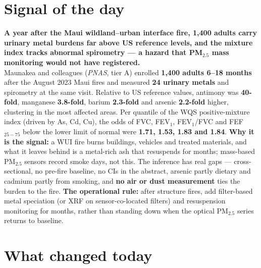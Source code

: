 \documentclass[10pt]{article}
\begin{document}
\vspace{6mm}

\section*{\sffamily\bfseries\color{Deep}Signal of the day}
\vspace{-1.5mm}{\color{Amber}\rule{\linewidth}{1.1pt}}\vspace{2.5mm}

\begin{keybox}
{\sffamily\bfseries\small\color{Deep}A year after the Maui wildland--urban interface
fire, 1,400 adults carry urinary metal burdens far above US reference levels, and the mixture
index tracks abnormal spirometry --- a hazard that PM$_{2.5}$ mass monitoring would not have
registered.}\\[1.4mm]
\footnotesize
Maunakea and colleagues (\textit{PNAS}, tier A) enrolled \textbf{1,400 adults 6--18 months} after the
August 2023 Maui fires and measured \textbf{24 urinary metals} and spirometry at the same visit.
Relative to US reference values, antimony was \textbf{40-fold}, manganese \textbf{3.8-fold}, barium
\textbf{2.3-fold} and arsenic \textbf{2.2-fold} higher, clustering in the most affected areas. Per
quantile of the WQS positive-mixture index (driven by As, Cd, Cu), the odds of FVC, FEV$_1$,
FEV$_1$/FVC and FEF$_{25-75}$ below the lower limit of normal were \textbf{1.71, 1.53, 1.83 and 1.84}.
\textbf{Why it is the signal:} a WUI fire burns buildings, vehicles and treated materials, and what
it leaves behind is a metal-rich ash that resuspends for months; mass-based PM$_{2.5}$ sensors
record smoke days, not this. The inference has real gaps --- cross-sectional, no pre-fire baseline,
no CIs in the abstract, arsenic partly dietary and cadmium partly from smoking, and \textbf{no air
or dust measurement} ties the burden to the fire. \textbf{The operational rule:} after structure
fires, add filter-based metal speciation (or XRF on sensor-co-located filters) and resuspension
monitoring for months, rather than standing down when the optical PM$_{2.5}$ series returns to
baseline.\par
\end{keybox}

\vspace{3mm}

\section*{\sffamily\bfseries\color{Deep}What changed today}
\vspace{-1.5mm}{\color{Amber}\rule{\linewidth}{1.1pt}}\vspace{2.5mm}
\end{document}
